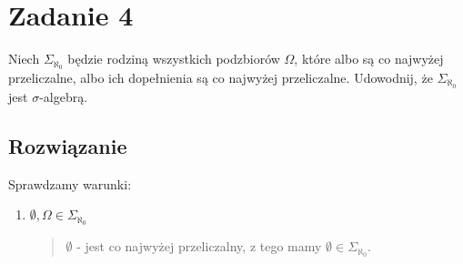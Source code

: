 \section{Zadanie 4}
Niech \(\Sigma_{\aleph_{0}}\) będzie rodziną wszystkich podzbiorów \(\Omega\),
które albo są co najwyżej przeliczalne, albo ich dopełnienia są co najwyżej przeliczalne. Udowodnij,
że \(\Sigma_{\aleph_{0}}\) jest \(\sigma\)-algebrą.

\subsection*{Rozwiązanie}
Sprawdzamy warunki:
\begin{enumerate}
	\item \(\emptyset, \Omega \in \Sigma_{\aleph_{0}}\)
	      \begin{quote}
		      \(\emptyset\) - jest co najwyżej przeliczalny, z tego mamy \(\emptyset \in \Sigma_{\aleph_{0}}\).


\end{quote}
\end{enumerate}
